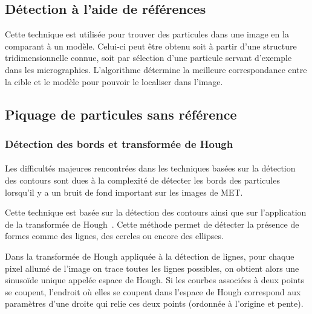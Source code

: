 \subsection{Détection à l'aide de références}

Cette technique est utilisée pour trouver des particules dans une image en la comparant à un modèle. Celui-ci peut \^etre obtenu soit à partir d'une structure tridimensionnelle connue, soit par sélection d'une particule servant d'exemple dans les micrographies. L'algorithme détermine la meilleure correspondance entre la cible et le modèle pour pouvoir le localiser dans l'image.%

\subsection{Piquage de particules sans référence}

\subsubsection{Détection des bords et transformée de Hough}



\paragraph*{}
Les difficultés majeures rencontrées dans les techniques basées sur la détection des contours sont dues à la complexité de détecter les bords des particules lorsqu'il y a un bruit de fond important sur les images de MET.%

\noindent
Cette technique est basée sur la détection des contours ainsi que sur l'application de la transformée de Hough~\cite{PdetectEHT:article}. Cette méthode permet de détecter la présence de formes comme des lignes, des cercles ou encore des ellipses.%

\noindent
Dans la transformée de Hough\cite{HT:url} appliquée à la détection de lignes, pour chaque pixel allumé de l'image on trace toutes les lignes possibles, on obtient alors une sinusoïde unique appelée espace de Hough. Si les courbes associées à deux points se coupent, l'endroit où elles se coupent dans l'espace de Hough correspond aux paramètres d'une droite qui relie ces deux points (ordonnée à l'origine et pente).%


